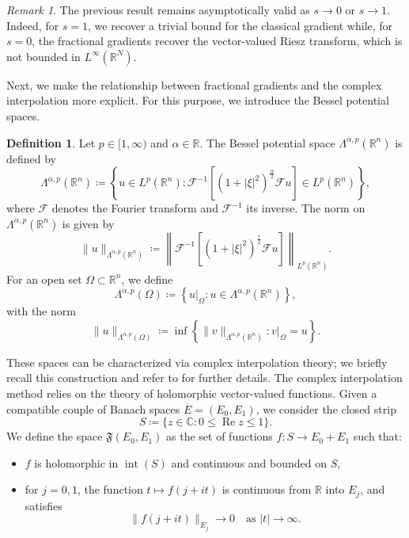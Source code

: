 \documentclass[]{amsart}
\theoremstyle{definition}
\theoremstyle{definition}
\newtheorem{definition}[theorem]{Definition}
\theoremstyle{remark}
\newtheorem{remark}[theorem]{Remark}
\numberwithin{equation}{section}
\begin{document}
\begin{remark} \label{rem:asymptotics-gradient}
	 The previous result remains asymptotically valid as \( s \to 0 \) or \( s \to 1 \). Indeed, for \( s = 1 \), we recover a trivial bound for the classical gradient while, for \( s = 0 \), the fractional gradients recover the vector-valued Riesz transform, which is not bounded in \( L^\infty(\mathbb{R}^N)\).
\end{remark}

Next, we make the relationship between fractional gradients and the complex interpolation more explicit. For this purpose, we introduce the Bessel potential spaces.



\begin{definition}
	Let \( p \in [1, \infty) \) and \( \alpha \in \mathbb{R} \). The Bessel potential space $\Lambda^{\alpha, p}(\mathbb{R}^n)$ is defined by
	\[
	\Lambda^{\alpha, p}(\mathbb{R}^n) \coloneq \left\{ u \in L^p(\mathbb{R}^n) : \mathcal{F}^{-1}\left[ (1+|\xi|^2)^{\frac{\alpha}{2}} \mathcal{F} u \right] \in L^p(\mathbb{R}^n) \right\},
	\]
	where \( \mathcal{F} \) denotes the Fourier transform and \( \mathcal{F}^{-1} \) its inverse. The norm on \( \Lambda^{\alpha, p}(\mathbb{R}^n) \) is given by
	\[
	\|u\|_{\Lambda^{\alpha, p}(\mathbb{R}^n)} \coloneq \left\| \mathcal{F}^{-1}\left[ (1+|\xi|^2)^{\frac{s}{2}} \mathcal{F} u \right] \right\|_{L^p(\mathbb{R}^n)}.
	\]
	For an open set \( \Omega \subset \mathbb{R}^n \),  we define
	\[
	\Lambda^{\alpha, p}(\Omega) \coloneq \left\{ u|_{\Omega} : u \in \Lambda^{\alpha, p}(\mathbb{R}^n) \right\},
	\]
	with the norm
	\[
	\|u\|_{\Lambda^{\alpha, p}(\Omega)} \coloneq \inf \left\{ \|v\|_{\Lambda^{\alpha, p}(\mathbb{R}^n)} : v|_{\Omega} = u \right\}.
	\]
\end{definition}

These spaces can be characterized via complex interpolation theory; we briefly recall this construction and refer to \cite[Theorem 3.7]{bellido2025bessel} for further details. The complex interpolation method relies on the theory of holomorphic vector-valued functions. Given a compatible couple of Banach spaces \( \overline{E} = (E_0, E_1) \), we consider the closed strip
\[
S \coloneq \{ z \in \mathbb{C} : 0 \leq \operatorname{Re} z \leq 1 \}.
\]
We define the space \( \mathfrak{F}(E_0, E_1) \) as the set of functions \( f: S \to E_0 + E_1 \) such that:

\begin{itemize}
	\item \( f \) is holomorphic in \( \operatorname{int}(S) \) and continuous and bounded on \( S \),
	\item for \( j = 0, 1 \), the function \( t \mapsto f(j + i t) \) is continuous from \( \mathbb{R} \) into \( E_j \), and satisfies
	\[
	\|f(j + i t)\|_{E_j} \to 0 \quad \text{as } |t| \to \infty.
	\]
\end{itemize}
\end{document}
